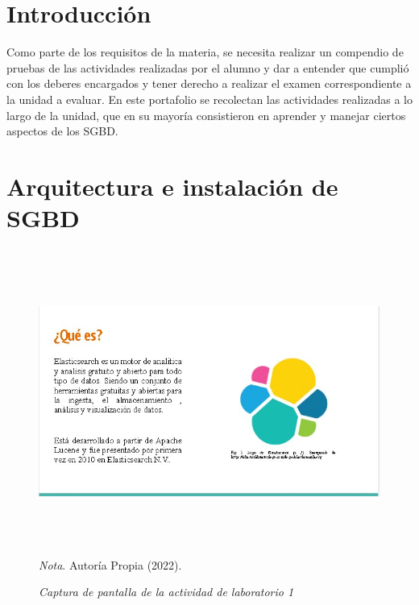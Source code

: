\documentclass[stu, 12pt, letterpaper, donotrepeattitle, floatsintext, natbib]{apa7}
\begin{document}
\section{Introducción}
    \begin{justifying}
Como parte de los requisitos de la materia, se necesita realizar un compendio de pruebas
de las actividades realizadas por el alumno y dar a entender que cumplió con los deberes encargados y tener derecho a realizar el examen 
correspondiente a la unidad a evaluar. En este portafolio se recolectan las actividades realizadas a lo largo de la unidad, que en su mayoría
consistieron en aprender y manejar ciertos aspectos de los SGBD.\par
    \end{justifying}
\vspace{\baselineskip}
\section{Arquitectura e instalación de SGBD}
    \begin{figure}[H]
        \caption{\emph{Captura de pantalla de la actividad de laboratorio 1\\}}
        \centering
        \smallskip
        \includegraphics[width=17cm, height=10cm]{act1.jpg}
        \bigskip
        \justifying\small\textit{Nota}. %
        Autoría Propia (2022).
\end{figure}
\vspace{\baselineskip}
\end{document}
